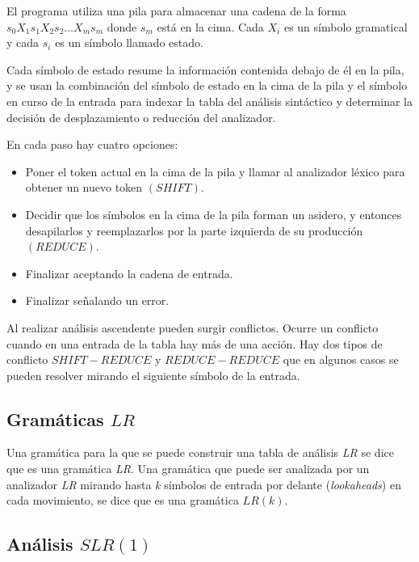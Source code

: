 El programa utiliza una pila para almacenar una cadena de la forma $s_{0}X_{1}s_{1}X_{2}s_{2}\ldots X_{m}s_{m} $ donde $s_{m}$ está en la cima. Cada $X_{i}$ es un símbolo gramatical y cada $s_{i}$ es un símbolo llamado estado.

Cada símbolo de estado resume la información contenida debajo de él en la pila, y se usan la combinación del símbolo de estado en la cima de la pila y el símbolo en curso de la entrada para indexar la tabla del análisis sintáctico y determinar la decisión de desplazamiento o reducción del analizador. 


                
En cada paso hay cuatro opciones:
\begin{itemize}
	\item Poner el token actual en la cima de la pila y llamar al analizador léxico para obtener un nuevo token $(SHIFT)$.
	\item Decidir que los símbolos en la cima de la pila forman un asidero, y entonces desapilarlos y reemplazarlos por la parte izquierda de su producción $(REDUCE)$.
	\item Finalizar aceptando la cadena de entrada.
	\item Finalizar señalando un error.
\end{itemize}

Al realizar análisis ascendente pueden surgir conflictos. Ocurre un conflicto cuando en una entrada de la tabla hay más de una acción. Hay dos tipos de conflicto $SHIFT-REDUCE$ y $REDUCE-REDUCE$ que en algunos casos se pueden resolver mirando el siguiente símbolo de la entrada.

\subsection{Gramáticas  $LR$}

Una gramática para la que se puede construir una tabla de análisis \textit{LR} se dice que es una gramática \textit{LR}. Una gramática que puede ser analizada por un analizador \textit{LR} mirando hasta \textit{k} símbolos de entrada por delante (\textit{lookaheads}) en cada movimiento, se dice que es una gramática $LR(k)$.

\subsection{Análisis $SLR(1)$}

